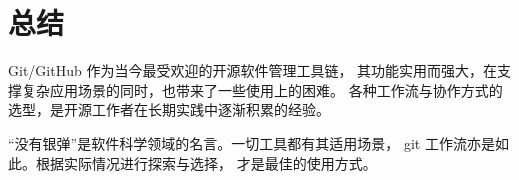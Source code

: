 \documentclass[../main.tex]{subfiles}
\begin{document}
\section{总结}

Git/GitHub 作为当今最受欢迎的开源软件管理工具链，
其功能实用而强大，在支撑复杂应用场景的同时，也带来了一些使用上的困难。
各种工作流与协作方式的选型，是开源工作者在长期实践中逐渐积累的经验。

“没有银弹”是软件科学领域的名言。一切工具都有其适用场景，
git 工作流亦是如此。根据实际情况进行探索与选择，
才是最佳的使用方式。
\end{document}
